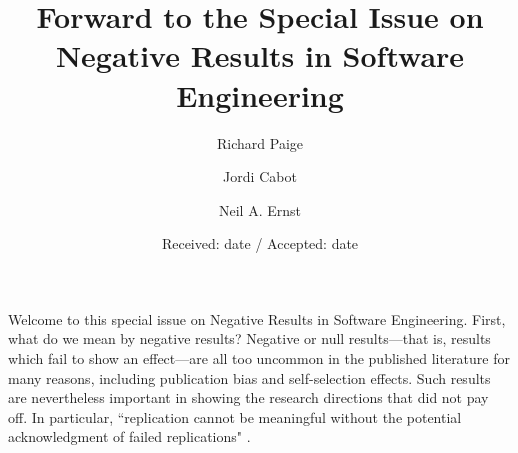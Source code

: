 \documentclass{svjour3}                     %
\begin{document}
\title{Forward to the Special Issue on Negative Results in Software Engineering}

\author{Richard Paige     \and
       Jordi Cabot \and
       Neil A. Ernst
}


\date{Received: date / Accepted: date}
\maketitle


Welcome to this special issue on Negative Results in Software Engineering. First, what do we mean by negative results? Negative or null results---that is, results which fail to show an effect---are all too uncommon in the published literature for many reasons, including publication bias and self-selection effects. Such results are nevertheless important in showing the research directions that did not pay off. In particular, ``replication cannot be meaningful without the potential acknowledgment of failed replications" \cite{FH}. %
\end{document}
